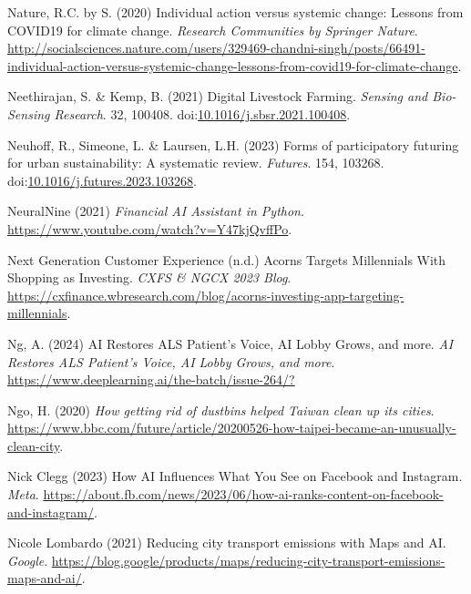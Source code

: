 \documentclass[
  letterpaper,
  DIV=11,
  numbers=noendperiod]{scrartcl}
\newlength{\cslhangindent}
\newenvironment{CSLReferences}[2] %
 {\begin{list}{}{%
  \setlength{\itemindent}{0pt}
  \setlength{\leftmargin}{0pt}
  \setlength{\parsep}{0pt}
  \ifodd #1
   \setlength{\leftmargin}{\cslhangindent}
   \setlength{\itemindent}{-1\cslhangindent}
  \fi
  \setlength{\itemsep}{#2\baselineskip}}}
 {\end{list}}
\begin{document}
\begin{CSLReferences}{0}{1}
Nature, R.C. by S. (2020) Individual action versus systemic change:
Lessons from {COVID19} for climate change. \emph{Research Communities by
Springer Nature}.
\url{http://socialsciences.nature.com/users/329469-chandni-singh/posts/66491-individual-action-versus-systemic-change-lessons-from-covid19-for-climate-change}.

Neethirajan, S. \& Kemp, B. (2021) Digital {Livestock Farming}.
\emph{Sensing and Bio-Sensing Research}. 32, 100408.
doi:\href{https://doi.org/10.1016/j.sbsr.2021.100408}{10.1016/j.sbsr.2021.100408}.

Neuhoff, R., Simeone, L. \& Laursen, L.H. (2023) Forms of participatory
futuring for urban sustainability: {A} systematic review.
\emph{Futures}. 154, 103268.
doi:\href{https://doi.org/10.1016/j.futures.2023.103268}{10.1016/j.futures.2023.103268}.

NeuralNine (2021) \emph{Financial {AI Assistant} in {Python}}.
\url{https://www.youtube.com/watch?v=Y47kjQvffPo}.

Next Generation Customer Experience (n.d.) Acorns {Targets Millennials
With Shopping} as {Investing}. \emph{CXFS \& NGCX 2023 Blog}.
\url{https://cxfinance.wbresearch.com/blog/acorns-investing-app-targeting-millennials}.

Ng, A. (2024) {AI Restores ALS Patient}'s {Voice}, {AI Lobby Grows}, and
more. \emph{AI Restores ALS Patient's Voice, AI Lobby Grows, and more}.
\url{https://www.deeplearning.ai/the-batch/issue-264/?}

Ngo, H. (2020) \emph{How getting rid of dustbins helped {Taiwan} clean
up its cities}.
\url{https://www.bbc.com/future/article/20200526-how-taipei-became-an-unusually-clean-city}.

Nick Clegg (2023) How {AI Influences What You See} on {Facebook} and
{Instagram}. \emph{Meta}.
\url{https://about.fb.com/news/2023/06/how-ai-ranks-content-on-facebook-and-instagram/}.

Nicole Lombardo (2021) Reducing city transport emissions with {Maps} and
{AI}. \emph{Google}.
\url{https://blog.google/products/maps/reducing-city-transport-emissions-maps-and-ai/}.


\end{CSLReferences}
\end{document}
